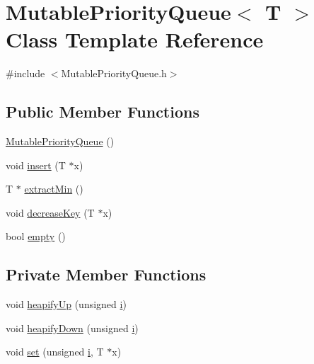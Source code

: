 \hypertarget{class_mutable_priority_queue}{}\section{Mutable\+Priority\+Queue$<$ T $>$ Class Template Reference}
\label{class_mutable_priority_queue}


{\ttfamily \#include $<$Mutable\+Priority\+Queue.\+h$>$}

\subsection*{Public Member Functions}
\begin{DoxyCompactItemize}
\item 
\mbox{\hyperlink{class_mutable_priority_queue_aba8ebedcbe659f2680bac229cfaca526}{Mutable\+Priority\+Queue}} ()
\item 
void \mbox{\hyperlink{class_mutable_priority_queue_a058fc182052af82e10cc3719e448b62d}{insert}} (T $\ast$x)
\item 
T $\ast$ \mbox{\hyperlink{class_mutable_priority_queue_a3880874d7364279ac0d6d31302b28853}{extract\+Min}} ()
\item 
void \mbox{\hyperlink{class_mutable_priority_queue_a0878839cc1d2dba2b8ab2e589ecc6405}{decrease\+Key}} (T $\ast$x)
\item 
bool \mbox{\hyperlink{class_mutable_priority_queue_a2edbb1f4a6fa3ff735700dfcebebe8d4}{empty}} ()
\end{DoxyCompactItemize}
\subsection*{Private Member Functions}
\begin{DoxyCompactItemize}
\item 
void \mbox{\hyperlink{class_mutable_priority_queue_ae2518c7a1be2bd1e7c633d82dede5450}{heapify\+Up}} (unsigned \mbox{\hyperlink{menu_8cpp_a98862a04b438a5359a542f245ca97b62}{i}})
\item 
void \mbox{\hyperlink{class_mutable_priority_queue_a699bfb6d976cabb01edead4c24284a08}{heapify\+Down}} (unsigned \mbox{\hyperlink{menu_8cpp_a98862a04b438a5359a542f245ca97b62}{i}})
\item 
void \mbox{\hyperlink{class_mutable_priority_queue_afbe461c0a2ea2f16006ed7e1bf9c105d}{set}} (unsigned \mbox{\hyperlink{menu_8cpp_a98862a04b438a5359a542f245ca97b62}{i}}, T $\ast$x)
\end{DoxyCompactItemize}
